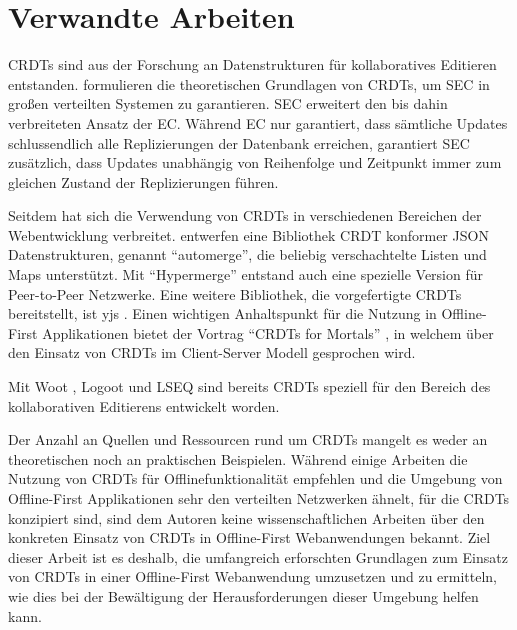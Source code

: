\documentclass[a4paper, 12pt]{scrreprt}
\begin{document}
\section{Verwandte Arbeiten}
\label{sec:VerwandteArbeiten}

\acp{CRDT} sind aus der Forschung an Datenstrukturen für kollaboratives Editieren entstanden. \citet{InproceedingsCRDTOriginal} formulieren die theoretischen Grundlagen von \acp{CRDT}, um \ac{SEC} in großen verteilten Systemen zu garantieren. \ac{SEC} erweitert den bis dahin verbreiteten Ansatz der \ac{EC}. Während EC nur garantiert, dass sämtliche Updates schlussendlich alle Replizierungen der Datenbank erreichen, garantiert SEC zusätzlich, dass Updates unabhängig von Reihenfolge und Zeitpunkt immer zum gleichen Zustand der Replizierungen führen.

Seitdem hat sich die Verwendung von \acp{CRDT} in verschiedenen Bereichen der Webentwicklung verbreitet. \citet{ArticleCRDTJSON} entwerfen eine Bibliothek CRDT konformer \ac{JSON} Datenstrukturen, genannt \enquote{automerge}, die beliebig verschachtelte Listen und Maps unterstützt. Mit \enquote{Hypermerge} entstand auch eine spezielle Version für Peer-to-Peer Netzwerke. Eine weitere Bibliothek, die vorgefertigte \acp{CRDT} bereitstellt, ist yjs \autocite{inproceedingsYjs}. Einen wichtigen Anhaltspunkt für die Nutzung in Offline-First Applikationen bietet der Vortrag \enquote{\acp{CRDT} for Mortals} \autocite{OnlineCrdtsForMortals}, in welchem über den Einsatz von \acp{CRDT} im Client-Server Modell gesprochen wird.  

Mit Woot \autocite{InproceedingsCRDTWoot}, Logoot \autocite{InproceedingsCRDTLogoot} und LSEQ \autocite{InproceedingsCRDTLSEQ} sind bereits \acp{CRDT} speziell für den Bereich des kollaborativen Editierens entwickelt worden. 

Der Anzahl an Quellen und Ressourcen rund um \acp{CRDT} mangelt es weder an theoretischen noch an praktischen Beispielen. Während einige Arbeiten die Nutzung von \acp{CRDT} für Offlinefunktionalität empfehlen und die Umgebung von Offline-First Applikationen sehr den verteilten Netzwerken ähnelt, für die \acp{CRDT} konzipiert sind, sind dem Autoren keine wissenschaftlichen Arbeiten über den konkreten Einsatz von \acp{CRDT} in Offline-First Webanwendungen bekannt. Ziel dieser Arbeit ist es deshalb, die umfangreich erforschten Grundlagen zum Einsatz von \acp{CRDT} in einer Offline-First Webanwendung umzusetzen und zu ermitteln, wie dies bei der Bewältigung der Herausforderungen dieser Umgebung helfen kann.
\end{document}
